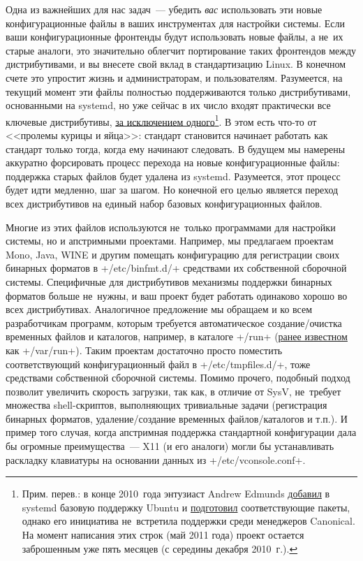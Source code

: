 \documentclass[10pt,oneside,a4paper]{article}
\begin{document}
Одна из важнейших для нас задач~--- убедить \emph{вас} использовать эти новые
конфигурационные файлы в ваших инструментах для настройки системы. Если ваши
конфигурационные фронтенды будут использовать новые файлы, а не~их старые
аналоги, это значительно облегчит портирование таких фронтендов между
дистрибутивами, и вы внесете свой вклад в стандартизацию Linux. В конечном счете
это упростит жизнь и администраторам, и пользователям. Разумеется, на текущий
момент эти файлы полностью поддерживаются только дистрибутивами, основанными на
systemd, но уже сейчас в их число входят практически все ключевые дистрибутивы,
\href{http://www.ubuntu.com/}{за исключением
одного}\footnote{Прим. перев.: в конце 2010~года энтузиаст Andrew Edmunds
\href{http://cgit.freedesktop.org/systemd/commit/?id=858dae181bb5461201ac1c04732d3ef4c67a0256}{добавил}
в systemd базовую поддержку Ubuntu и
\href{https://wiki.ubuntu.com/systemd}{подготовил} соответствующие пакеты,
однако его инициатива не~встретила поддержки среди менеджеров Canonical. На
момент написания этих строк (май 2011 года) проект остается заброшенным уже пять
месяцев (с середины декабря 2010~г.).}. В этом есть что-то от <<пролемы курицы и
яйца>>: стандарт становится начинает работать как стандарт только тогда, когда
ему начинают следовать. В будущем мы намерены аккуратно форсировать процесс
перехода на новые конфигурационные файлы: поддержка старых файлов будет удалена
из systemd. Разумеется, этот процесс будет идти медленно, шаг за шагом. Но
конечной его целью является переход всех дистрибутивов на единый набор базовых
конфигурационных файлов.

Многие из этих файлов используются не~только программами для настройки системы,
но и апстримными проектами. Например, мы предлагаем проектам Mono, Java, WINE и
другим помещать конфигурацию для регистрации своих бинарных форматов в
+/etc/binfmt.d/+ средствами их собственной сборочной системы. Специфичные для
дистрибутивов механизмы поддержки бинарных форматов больше не~нужны, и ваш
проект будет работать одинаково хорошо во всех дистрибутивах. Аналогичное
предложение мы обращаем и ко всем разработчикам программ, которым требуется
автоматическое создание/очистка временных файлов и каталогов,
например, в каталоге +/run+ (\href{http://lwn.net/Articles/436012/}{ранее
известном} как +/var/run+). Таким проектам достаточно просто поместить
соответствующий конфигурационный файл в +/etc/tmpfiles.d/+, тоже средствами
собственной сборочной системы. Помимо прочего, подобный подход позволит
увеличить скорость загрузки, так как, в отличие от SysV, не~требует множества
shell-скриптов, выполняющих тривиальные задачи (регистрация бинарных форматов,
удаление/создание временных файлов/каталогов и т.п.). И пример того случая,
когда апстримная поддержка стандартной конфигурации дала бы огромные
преимущества~--- X11 (и его аналоги) могли бы устанавливать раскладку клавиатуры
на основании данных из +/etc/vconsole.conf+.
\end{document}
